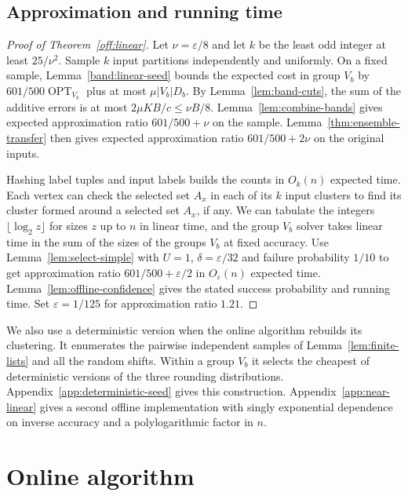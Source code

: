 \documentclass[11pt]{article}
\newcommand{\OPT}{\operatorname{OPT}}
\begin{document}
\subsection{Approximation and running time}

\begin{proof}[Proof of Theorem~\ref{off:linear}]
Let $\nu=\varepsilon/8$ and let $k$ be the least odd integer at least
$25/\nu^2$. Sample $k$ input partitions independently and uniformly. On a fixed sample, Lemma~\ref{band:linear-seed}
bounds the expected cost in group $V_b$ by $601/500\OPT_{V_b}$
plus at most $\mu|V_b|D_b$.
By Lemma~\ref{lem:band-cuts}, the sum of the additive errors is at
most $2\mu KB/c\le\nu B/8$. Lemma~\ref{lem:combine-bands} gives
expected approximation ratio $601/500+\nu$ on the sample. Lemma~\ref{thm:ensemble-transfer}
then gives expected approximation ratio $601/500+2\nu$ on the original
inputs.

Hashing label tuples and input labels builds the counts in
$O_k(n)$ expected time. Each vertex can check the selected set $A_x$ in each of its
$k$ input clusters to find its cluster formed around a selected set $A_x$, if any. We can
tabulate the integers $\lfloor\log_2 z\rfloor$ for sizes $z$ up to $n$ in linear time, and the group $V_b$
solver takes linear time in the sum of the sizes of the groups $V_b$ at fixed
accuracy. Use Lemma~\ref{lem:select-simple} with $U=1$,
$\delta=\varepsilon/32$ and failure probability $1/10$ to get
approximation ratio $601/500+\varepsilon/2$ in $O_\varepsilon(n)$
expected time. Lemma~\ref{lem:offline-confidence} gives the stated
success probability and running time. Set $\varepsilon=1/125$ for approximation ratio $1.21$.
\end{proof}

We also use a deterministic version when the online algorithm rebuilds
its clustering. It
enumerates the pairwise independent samples of
Lemma~\ref{lem:finite-lists} and all the random shifts. Within a group $V_b$
it selects the cheapest of deterministic versions of the three
rounding distributions. Appendix~\ref{app:deterministic-seed}
gives this construction. Appendix~\ref{app:near-linear} gives a
second offline implementation with singly exponential dependence
on inverse accuracy and a polylogarithmic factor in $n$.

\section{Online algorithm}
\label{joint:section}
\OnlineMain*
\end{document}
